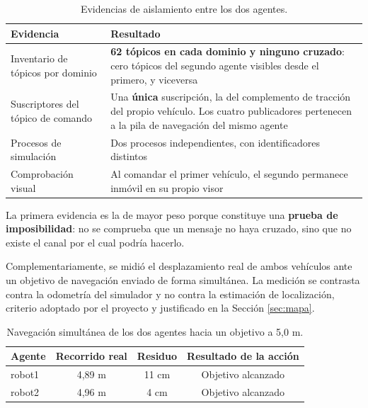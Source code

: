 \documentclass[12pt,letterpaper]{article}
\begin{document}
\begin{table}[H]
    \centering
    \small
    \caption{Evidencias de aislamiento entre los dos agentes.}
    \label{tab:aislamiento}
    \begin{tabular}{@{}p{5.2cm}p{8.3cm}@{}}
        \toprule
        \textbf{Evidencia} & \textbf{Resultado} \\ \midrule
        Inventario de tópicos por dominio & \textbf{62 tópicos en cada dominio y ninguno cruzado}: cero tópicos del segundo agente visibles desde el primero, y viceversa \\ \addlinespace
        Suscriptores del tópico de comando & Una \textbf{única} suscripción, la del complemento de tracción del propio vehículo. Los cuatro publicadores pertenecen a la pila de navegación del mismo agente \\ \addlinespace
        Procesos de simulación & Dos procesos independientes, con identificadores distintos \\ \addlinespace
        Comprobación visual & Al comandar el primer vehículo, el segundo permanece inmóvil en su propio visor \\ \bottomrule
    \end{tabular}
\end{table}

La primera evidencia es la de mayor peso porque constituye una \textbf{prueba de imposibilidad}: no se comprueba que un mensaje no haya cruzado, sino que no existe el canal por el cual podría hacerlo.

Complementariamente, se midió el desplazamiento real de ambos vehículos ante un objetivo de navegación enviado de forma simultánea. La medición se contrasta contra la odometría del simulador y no contra la estimación de localización, criterio adoptado por el proyecto y justificado en la Sección \ref{sec:mapa}.

\begin{table}[H]
    \centering
    \small
    \caption{Navegación simultánea de los dos agentes hacia un objetivo a 5,0 m.}
    \label{tab:navegacion}
    \begin{tabular}{@{}lccc@{}}
        \toprule
        \textbf{Agente} & \textbf{Recorrido real} & \textbf{Residuo} & \textbf{Resultado de la acción} \\ \midrule
        robot1 & 4,89 m & 11 cm & Objetivo alcanzado \\
        robot2 & 4,96 m & 4 cm  & Objetivo alcanzado \\ \bottomrule
    \end{tabular}
\end{table}
\end{document}
